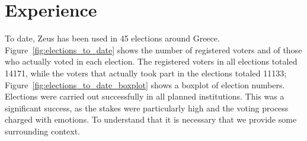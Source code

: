 \documentclass[letterpaper,10pt]{article}
\begin{document}






\section{Experience}
\label{sec:experience}

To date, Zeus has been used in 45 elections around Greece.
Figure~\ref{fig:elections_to_date} shows the number of registered
voters and of those who actually voted in each election. The
registered voters in all elections totaled 14171, while the voters
that actually took part in the elections totaled 11133;
Figure~\ref{fig:elections_to_date_boxplot} shows a boxplot of
election numbers. Elections were carried out successfully in all
planned institutions. This was a significant success, as the stakes
were particularly high and the voting process charged with emotions.
To understand that it is necessary that we provide some surrounding
context.
\end{document}
